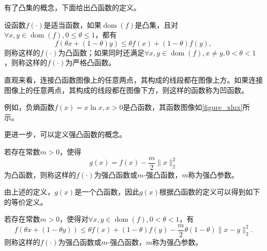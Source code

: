 有了凸集的概念，下面给出凸函数\cite{2004Convex}的定义。

\begin{definition}
    设函数$f(\cdot)$是适当函数，如果$\mathop{\mathrm{dom}} (f)$是凸集，且对$\forall x, y\in \mathop{\mathrm{dom}} (f), 0\leq \theta \leq 1$，都有
    \begin{equation}
        f(\theta x+(1-\theta)y) \leq \theta f(x) + (1-\theta)f(y),
    \end{equation}
    则称这样的$f(\cdot)$为凸函数；如果同时还满足$\forall x, y\in \mathop{\mathrm{dom}} (f), x \neq y, 0<\theta<1$，则称这样的$f(\cdot)$为严格凸函数。
\end{definition}

直观来看，连接凸函数图像上的任意两点，其构成的线段都在图像上方。如果连接图像上的任意两点，其构成的线段都在图像下方，则这样的函数称为凹函数。

例如，负熵函数$f(x)=x\ln x, x>0$是凸函数，其函数图像如\ref{figure_xlnx}所示。


更进一步，可以定义强凸函数\cite{2004Convex}的概念。

\begin{definition}\label{def_convex_1}
    若存在常数$m>0$，使得
    \begin{equation}
        g(x) = f(x) - \frac{m}{2}\|x\|_{2}^{2}
    \end{equation}
    为凸函数，则称这样的$f(\cdot)$为强凸函数或$m$-强凸函数，$m$称为强凸参数。
\end{definition}

由上述的定义，$g(x)$是一个凸函数，因此$g(x)$根据凸函数的定义可以得到如下的等价定义。

\begin{definition}\label{def_convex_2}
    若存在常数$m>0$，使得对$\forall x, y \in \mathop{\mathrm{dom}} (f), 0<\theta<1$，有
    \begin{equation}
        f(\theta x+(1-\theta y)) \leq \theta f(x) + (1-\theta)f(y) - \frac{m}{2}\theta(1-\theta)\|x-y\|_{2}^{2}.
    \end{equation}
    则称这样的$f(\cdot)$为强凸函数或$m$-强凸函数，$m$称为强凸参数。
\end{definition}

